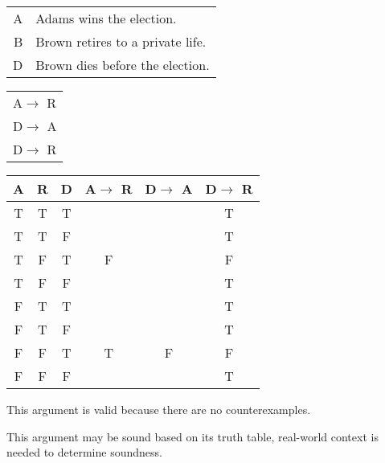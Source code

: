 \section{}
\centering
\begin{tabular}{r l}
    A & Adams wins the election. \\
    B & Brown retires to a private life. \\
    D & Brown dies before the election.
\end{tabular}
\begin{tabular}{l}
    A$\rightarrow$ R\\
    D$\rightarrow$ A\\
    \hline
    D$\rightarrow$ R
\end{tabular}

\begin{tabular}{c|c|c||c|c||c}
    A & R & D & A$\rightarrow$ R & D$\rightarrow$ A & D$\rightarrow$ R \\
    \hline
    T & T & T &   &   & T \\
    T & T & F &   &   & T \\
    T & F & T & F &   & F \\
    T & F & F &   &   & T \\
    F & T & T &   &   & T \\
    F & T & F &   &   & T \\
    F & F & T & T & F & F \\
    F & F & F &   &   & T
\end{tabular}

\justifying
\noindent This argument is valid because there are no counterexamples.

\noindent This argument may be sound based on its truth table, real-world context is needed to determine soundness.